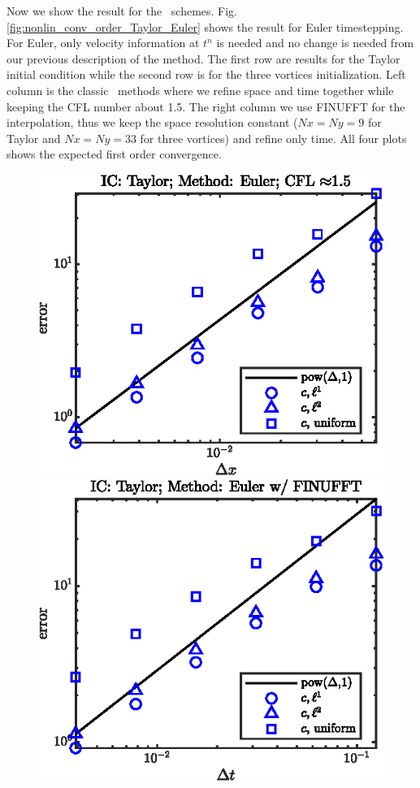 \documentclass[11pt,letterpaper]{article}
\begin{document}
Now we show the result for the \sml\ schemes. Fig. \ref{fig:nonlin_conv_order_Taylor_Euler} shows the result for Euler timestepping. For Euler, only velocity information at $t^n$ is needed and no change is needed from our previous description of the method. The first row are results for the Taylor initial condition while the second row is for the three vortices initialization. Left column is the classic \sml\ methods where we refine space and time together while keeping the CFL number about 1.5. The right column we use FINUFFT for the interpolation, thus we keep the space resolution constant ($Nx = Ny = 9$ for Taylor and $Nx = Ny = 33$ for three vortices) and refine only time. All four plots shows the expected first order convergence. 
\begin{figure}[H]
    \centering
    \includegraphics{figs/nonlin_conv_order_Taylor_Euler}
    \includegraphics{figs/nonlin_conv_order_Taylor_finu_Euler}

\end{figure}
\end{document}
